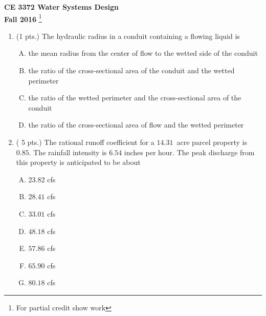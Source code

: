 \documentclass[11pt]{article}
\begin{document}
\begingroup
\begin{center}
{\textbf{{ CE 3372 Water Systems Design}  \\ Fall 2016} }\footnote{For partial credit show work}
\end{center}
\endgroup


\begin{enumerate}
\item  (1 pts.) The hydraulic radius in a conduit containing a flowing liquid is
\begin{enumerate} [(A)]
\item	the mean radius from the center of flow to the wetted side of the conduit
\item	the ratio of the cross-sectional area of the conduit and the wetted perimeter
\item	the ratio of the wetted perimeter and the cross-sectional area of the conduit
\item	the ratio of the cross-sectional area of flow and the wetted perimeter
\end{enumerate}
\item ( 5 pts.)
The rational runoff coefficient for a $14.31$~acre parcel property is $0.85$.  
The rainfall intensity is $6.54$ inches per hour.  
The peak discharge from this property is anticipated to be about
\begin{enumerate} [(A)]
\item $23.82$ cfs
\item $28.41$ cfs
\item $33.01$ cfs
\item $48.18$ cfs
\item $57.86$ cfs
\item $65.90$ cfs
\item $80.18$ cfs
\end{enumerate}

\end{enumerate}
\end{document}
